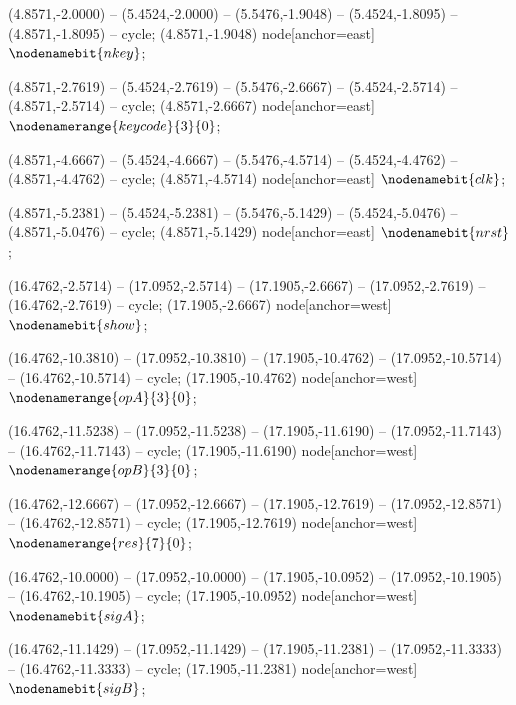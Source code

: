    (4.8571,-2.0000) -- (5.4524,-2.0000) -- (5.5476,-1.9048) -- (5.4524,-1.8095) -- (4.8571,-1.8095) -- cycle;
   (4.8571,-1.9048) node[anchor=east] {$\nodenamebit{nkey}$};

   (4.8571,-2.7619) -- (5.4524,-2.7619) -- (5.5476,-2.6667) -- (5.4524,-2.5714) -- (4.8571,-2.5714) -- cycle;
   (4.8571,-2.6667) node[anchor=east] {$\nodenamerange{keycode}{3}{0}$};

   (4.8571,-4.6667) -- (5.4524,-4.6667) -- (5.5476,-4.5714) -- (5.4524,-4.4762) -- (4.8571,-4.4762) -- cycle;
   (4.8571,-4.5714) node[anchor=east] {$\nodenamebit{clk}$};

   (4.8571,-5.2381) -- (5.4524,-5.2381) -- (5.5476,-5.1429) -- (5.4524,-5.0476) -- (4.8571,-5.0476) -- cycle;
   (4.8571,-5.1429) node[anchor=east] {$\nodenamebit{nrst}$};

   (16.4762,-2.5714) -- (17.0952,-2.5714) -- (17.1905,-2.6667) -- (17.0952,-2.7619) -- (16.4762,-2.7619) -- cycle;
   (17.1905,-2.6667) node[anchor=west] {$\nodenamebit{show}$};

   (16.4762,-10.3810) -- (17.0952,-10.3810) -- (17.1905,-10.4762) -- (17.0952,-10.5714) -- (16.4762,-10.5714) -- cycle;
   (17.1905,-10.4762) node[anchor=west] {$\nodenamerange{opA}{3}{0}$};

   (16.4762,-11.5238) -- (17.0952,-11.5238) -- (17.1905,-11.6190) -- (17.0952,-11.7143) -- (16.4762,-11.7143) -- cycle;
   (17.1905,-11.6190) node[anchor=west] {$\nodenamerange{opB}{3}{0}$};

   (16.4762,-12.6667) -- (17.0952,-12.6667) -- (17.1905,-12.7619) -- (17.0952,-12.8571) -- (16.4762,-12.8571) -- cycle;
   (17.1905,-12.7619) node[anchor=west] {$\nodenamerange{res}{7}{0}$};

   (16.4762,-10.0000) -- (17.0952,-10.0000) -- (17.1905,-10.0952) -- (17.0952,-10.1905) -- (16.4762,-10.1905) -- cycle;
   (17.1905,-10.0952) node[anchor=west] {$\nodenamebit{sigA}$};

   (16.4762,-11.1429) -- (17.0952,-11.1429) -- (17.1905,-11.2381) -- (17.0952,-11.3333) -- (16.4762,-11.3333) -- cycle;
   (17.1905,-11.2381) node[anchor=west] {$\nodenamebit{sigB}$};


